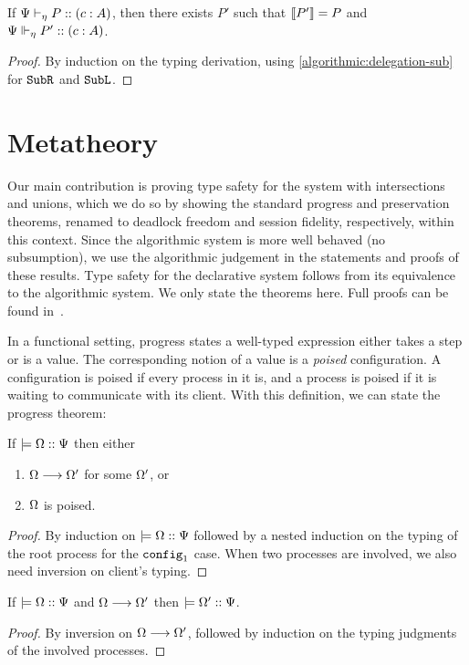 \documentclass[submission,copyright,creativecommons]{eptcs}
\begin{document}
\begin{theorem}
  If ${\Psi} \vdash_{\eta} P :: (c : A)$, then there exists $P'$ such that $\left \llbracket {P'} \right \rrbracket = P$ and ${\Psi} \Vdash_{\eta} P' :: (c : A)$.
\end{theorem}
\begin{proof}
  By induction on the typing derivation, using \cref{algorithmic:delegation-sub} for $\texttt{Sub}\texttt{R}$ and $\texttt{Sub}\texttt{L}$.
\end{proof}


\section{Metatheory}
\label{metatheory}

Our main contribution is proving type safety for the system with intersections and unions, which we do so by showing the standard progress and preservation theorems, renamed to deadlock freedom and session fidelity, respectively, within this context. Since the algorithmic system is more well behaved (no subsumption), we use the algorithmic judgement in the statements and proofs of these results. Type safety for the declarative system follows from its equivalence to the algorithmic system. We only state the theorems here. Full proofs can be found in~\cite{Acay16}.

In a functional setting, progress states a well-typed expression either takes a step or is a value. The corresponding notion of a value is a \emph{poised} configuration. A configuration is poised if every process in it is, and a process is poised if it is waiting to communicate with its client. With this definition, we can state the progress theorem:

\begin{theorem}[Progress]
If $\models {\Omega} :: {\Psi}$ then either
\begin{enumerate}
  \item $\Omega \longrightarrow \Omega'$ for some $\Omega'$, or
  \item $\Omega$ is poised.
\end{enumerate}
\end{theorem}
\begin{proof}
  By induction on $\models {\Omega} :: {\Psi}$ followed by a nested induction on the typing of the root process for the $\texttt{config}_1$ case. When two processes are involved, we also need inversion on client's typing.
\end{proof}

\begin{theorem}[Preservation]
If $\models {\Omega} :: {\Psi}$ and $\Omega \longrightarrow \Omega'$ then $\models {\Omega'} :: {\Psi}$.
\end{theorem}
\begin{proof}
  By inversion on $\Omega \longrightarrow \Omega'$, followed by induction on the typing judgments of the involved processes.
\end{proof}
\end{document}
